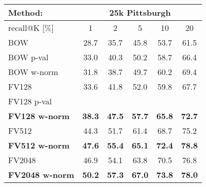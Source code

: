 \begin{table}[t!]
\begin{centering}
	\begin{tabularx}{0.89\linewidth}{|l|c c c c c|}
		\hline 
		\rowcolor{maroon!50}
		Method: & \multicolumn{5}{c|}{25k Pittsburgh} \\
		\hline 
		\hline 
		\rowcolor{maroon!50}
		recall@K [$\%$] & 1 & 2 & 5 & 10 & 20 \\
		\hline
		\rowcolor{maroon!10}
		BOW           & 28.7  & 35.7  & 45.8 & 53.7   & 61.5 \\
        \rowcolor{maroon!10}
		BOW p-val     & 33.0  & 40.3  & 50.2 & 58.7   &  66.4 \\
        \rowcolor{maroon!10}
		BOW w-norm  & 31.8  & 38.7  & 49.7 & 60.2   & 69.4 \\
        \hline
		\rowcolor{maroon!10}
		FV128         & 33.6  & 41.8  & 52.0 & 59.8   & 67.7  \\
		\rowcolor{maroon!10}
		FV128 p-val                 & \textbf{}       & \textbf{}     & \textbf{}     & \textbf{}     & \textbf{}  \\
    \rowcolor{maroon!10}
		\textbf{FV128 w-norm}     & \textbf{38.3}   & \textbf{47.5} & \textbf{57.7} & \textbf{65.8} & \textbf{72.7}  \\
    \hline  
    \rowcolor{maroon!10}
    FV512         & 44.3 & 51.7   & 61.4  & 68.7   & 75.2  \\
    \rowcolor{maroon!10}
    \textbf{FV512 w-norm}   & \textbf{47.6}  & \textbf{55.4} & \textbf{65.1} & \textbf{72.4} & \textbf{78.8}  \\
    \hline
		\rowcolor{maroon!10}
		FV2048        & 46.9  & 54.1  & 63.8  & 70.5    & 76.8 \\
		\rowcolor{maroon!10}
        \rowcolor{maroon!10}
        \textbf{FV2048 w-norm}  & \textbf{50.2} & \textbf{57.3} & \textbf{67.0} & \textbf{73.8} & \textbf{78.0} \\
        \hline

\end{tabularx}
\end{centering}
\end{table}
